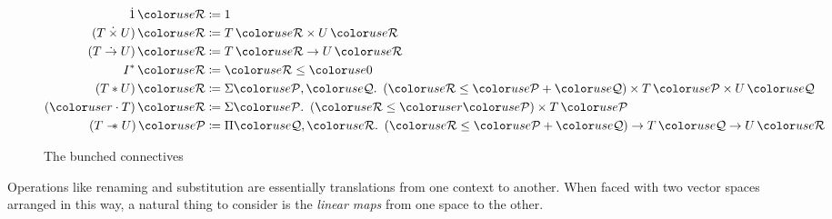 \begin{figure}
  \begin{align*}
    \dot1\,\grR &\coloneqq 1 \\
    (T \dottimes U)\,\grR &\coloneqq T\,\grR \times U\,\grR \\
    (T \dotto U)\,\grR &\coloneqq T\,\grR \to U\,\grR \\
    I^*\,\grR &\coloneqq \grR \leq \gr0 \\
    (T \sep U)\,\grR &\coloneqq \Sigma \grP,\grQ.~\plr{\grR \leq \grP + \grQ}
                       \times T\,\grP \times U\,\grQ \\
    (\gr r \cdot T)\,\grR &\coloneqq \Sigma \grP.~\plr{\grR \leq \gr r\grP}
                       \times T\,\grP \\
    (T \wand U)\,\grP &\coloneqq \Pi \grQ,\grR.~\plr{\grR \leq \grP + \grQ}
                       \to T\,\grQ \to U\,\grR
  \end{align*}
  \caption{The bunched connectives}
  \label{fig:bunched}
\end{figure}

Operations like renaming and substitution are essentially translations from one
context to another.
When faced with two vector spaces arranged in this way, a natural thing to
consider is the \emph{linear maps} from one space to the other.
